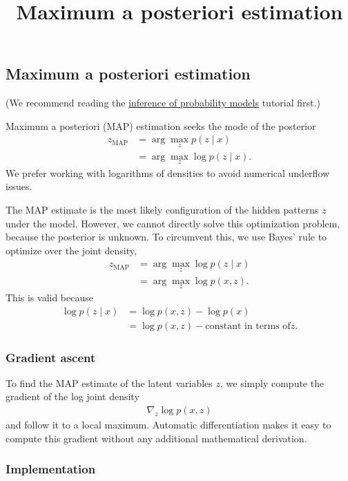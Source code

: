 \title{Maximum a posteriori estimation}

\subsection{Maximum a posteriori estimation}

(We recommend reading the 
\href{tut_inference_probability_models.html}{inference of probability models}
tutorial first.)

Maximum a posteriori (MAP) estimation seeks the mode of the posterior
\begin{align*}
  z_\text{MAP}
  &=
  \arg \max_z
  p(z \mid x)\\
  &=
  \arg \max_z
  \log p(z \mid x).
\end{align*}
We prefer working with logarithms of densities to avoid numerical underflow
issues.

The MAP estimate is the most likely configuration of the hidden patterns $z$
under the model. However, we cannot directly solve this optimization problem,
because the posterior is unknown. To circumvent this, we use Bayes' rule to
optimize over the joint density,
\begin{align*}
  z_\text{MAP}
  &=
  \arg \max_z
  \log p(z \mid x)\\
  &=
  \arg \max_z
  \log p(x, z).  
\end{align*}
This is valid because
\begin{align*}
  \log p(z \mid x)
  &=
  \log p(x, z) - \log p(x)\\
  &=
  \log p(x, z) - \text{constant in terms of} z.
\end{align*}

\subsubsection{Gradient ascent}

To find the MAP estimate of the latent variables $z$, we simply compute the
gradient of the log joint density
\begin{align*}
  \nabla_z
  \log p(x, z)
\end{align*}
and follow it to a local maximum. Automatic differentiation makes it easy to
compute this gradient without any additional mathematical derivation.

\subsubsection{Implementation}

